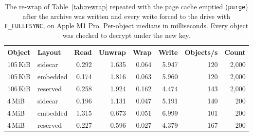 \begin{table}[t]
\caption{The re-wrap of Table~\ref{tab:rewrap} repeated with the page cache emptied (\texttt{purge}) after the archive was written and every write forced to the drive with \texttt{F\_FULLFSYNC}, on Apple M1 Pro. Per-object medians in milliseconds. Every object was checked to decrypt under the new key.}
\label{tab:rewrapcold}
\begin{tabular}{llrrrrrr}
\toprule
Object & Layout & Read & Unwrap & Wrap & Write & Objects/s & Count\\
\midrule
105\,KiB & sidecar & 0.292 & 1.635 & 0.064 & 5.947 & 120 & 2,000\\
105\,KiB & embedded & 0.174 & 1.816 & 0.063 & 5.960 & 120 & 2,000\\
106\,KiB & reserved & 0.258 & 1.924 & 0.162 & 4.474 & 143 & 2,000\\
\midrule
4\,MiB & sidecar & 0.196 & 1.131 & 0.047 & 5.191 & 140 & 200\\
4\,MiB & embedded & 1.315 & 0.673 & 0.051 & 6.999 & 101 & 200\\
4\,MiB & reserved & 0.227 & 0.596 & 0.027 & 4.379 & 167 & 200\\
\bottomrule
\end{tabular}
\end{table}
